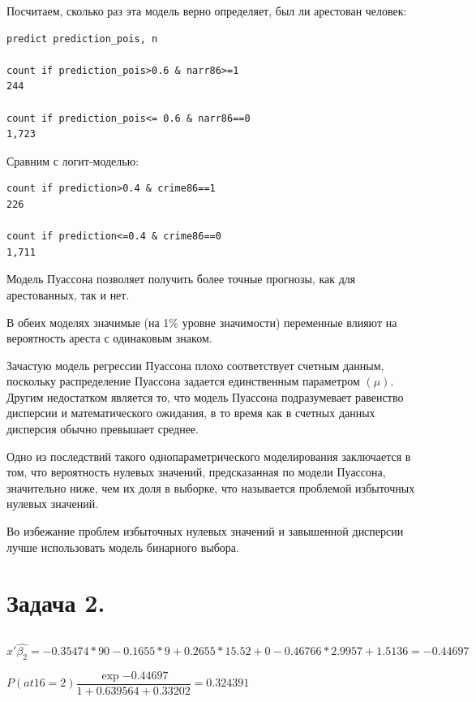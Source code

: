 \documentclass[12pt,a4paper, oneside]{extreport}
\begin{document}
Посчитаем, сколько раз эта модель верно определяет, был ли арестован человек:

\begin{verbatim}
predict prediction_pois, n

count if prediction_pois>0.6 & narr86>=1
244

count if prediction_pois<= 0.6 & narr86==0
1,723
\end{verbatim}

Сравним с логит-моделью:

\begin{verbatim}
count if prediction>0.4 & crime86==1
226

count if prediction<=0.4 & crime86==0
1,711
\end{verbatim}

Модель Пуассона позволяет получить более  точные прогнозы, как для арестованных, так и нет.

В обеих моделях значимые (на 1\% уровне значимости) переменные влияют на вероятность ареста с одинаковым знаком.

Зачастую модель регрессии Пуассона плохо соответствует счетным данным,  поскольку распределение Пуассона задается единственным параметром $(\mu)$. 
Другим недостатком является то, что модель Пуассона подразумевает равенство дисперсии и математического ожидания, в то время как в счетных данных дисперсия обычно превышает среднее.

Одно из последствий такого однопараметрического моделирования заключается в том, что вероятность нулевых значений, предсказанная по модели Пуассона, значительно ниже, чем их доля в выборке, что называется проблемой избыточных нулевых значений.


Во избежание проблем  избыточных нулевых значений и завышенной дисперсии лучше использовать модель бинарного выбора.

\section{Задача 2.}


\subsection{}

$x'\hat{\beta_2} = -0.35474*90 - 0.1655*9+ 0.2655*15.52+0-0.46766*2.9957+1.5136  = -0.44697 $

$P(at16=2) \dfrac{\exp{-0.44697}}{1+0.639564+0.33202} = 0.324391$
\end{document}
